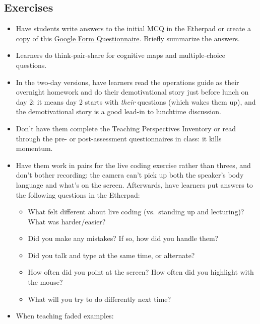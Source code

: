 \subsection{Exercises}\label{exercises}

\begin{itemize}
\item
  Have students write answers to the initial MCQ in the Etherpad or
  create a copy of this
  \href{http://goo.gl/forms/EHXfBSDmvqBLLVzj1}{Google Form
  Questionnaire}. Briefly summarize the answers.
\item
  Learners do think-pair-share for cognitive maps and multiple-choice
  questions.
\item
  In the two-day versions, have learners read the operations guide as
  their overnight homework and do their demotivational story just before
  lunch on day 2: it means day 2 starts with \emph{their} questions
  (which wakes them up), and the demotivational story is a good lead-in
  to lunchtime discussion.
\item
  Don't have them complete the Teaching Perspectives Inventory or read
  through the pre- or post-assessment questionnaires in class: it kills
  momentum.
\item
  Have them work in pairs for the live coding exercise rather than
  threes, and don't bother recording: the camera can't pick up both the
  speaker's body language and what's on the screen. Afterwards, have
  learners put answers to the following questions in the Etherpad:

  \begin{itemize}
  \itemsep1pt\parskip0pt
  \item
    What felt different about live coding (vs.~standing up and
    lecturing)? What was harder/easier?
  \item
    Did you make any mistakes? If so, how did you handle them?
  \item
    Did you talk and type at the same time, or alternate?
  \item
    How often did you point at the screen? How often did you highlight
    with the mouse?
  \item
    What will you try to do differently next time?
  \end{itemize}
\item
  When teaching faded examples:


\end{itemize}
